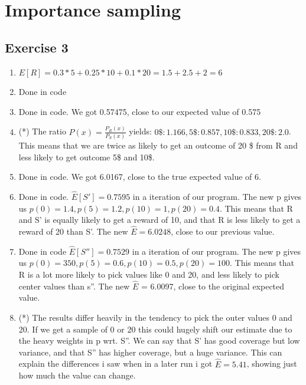 \documentclass{article}
\begin{document}
\section{Importance sampling}
\subsection*{Exercise 3}

\begin{enumerate}
    \item $E[R] =  0.3 * 5 + 0.25 * 10 + 0.1 * 20 = 1.5 + 2.5 + 2 = 6$
    
    \item Done in code 
    
    \item Done in code. We got 0.57475, close to our expected value of 0.575
    
    \item (*) The ratio $P(x) = \frac{P_R(x)}{P_S(x)}$ yields: $0\$: 1.166, 5\$ : 0.857, 10\$ : 0.833, 20\$ : 2.0 $. This means that we are twice as likely to get an outcome of 20 \$ from R and less likely to get outcome 5\$ and 10\$.
    
    \item Done in code. We got 6.0167, close to the true expected value of 6.
   
    \item Done in code. $\hat{E}[S'] = 0.7595$ in a iteration of our program. The new p gives us $p(0) = 1.4 , p(5) =  1.2, p(10) = 1, p(20) = 0.4$. This means that R and S' is equally likely to get a reward of 10, and that R is less likely to get a reward of 20 than S'. The new $\hat{E} = 6.0248$,  close to our previous value.
    
    \item Done in code  $\hat{E}[S''] = 0.7529$ in a iteration of our program. The new p gives us $p(0) = 350 , p(5) =  0.6, p(10) = 0.5, p(20) = 100$. This means that R is a lot more likely to pick values like 0 and 20, and less likely to pick center values than s''. The new $\hat{E}$ = 6.0097, close to the original expected value. 
   
    \item (*) The results differ heavily in the tendency to pick the outer values 0 and 20. If we get a sample of 0 or 20 this could hugely shift our estimate due to the heavy weights in p wrt. S''. We can say that S' has good coverage but low variance, and that S'' has higher coverage, but a huge variance. This can explain the differences i saw when in a later run i got $\hat{E} = 5.41$, showing just how much the value can change. 

\end{enumerate}
\end{document}

